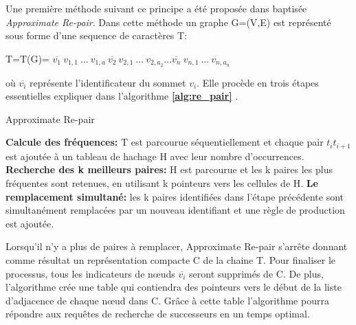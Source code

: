 		Une première méthode suivant ce principe a été proposée dans \citep{claude2010fast} baptisée \textit{Approximate Re-pair}. Dans cette méthode un graphe G=(V,E) est représenté sous forme d'une sequence de caractères T: \begin{center}
		T=T(G)= $\overline{v_{1}}\ v_{1,1}\ ...\ v_{1,a}\ \overline{v_{2}}\ v_{2,1}\ ...\ v_{2,a_{2}} ... \overline{v_{n}}\ v_{n,1}\ ...\ v_{n,a_{n}}\ $						
\end{center}	
où $\overline{v_{i}}$ représente l'identificateur du sommet $v_{i}$. Elle procède en trois étapes essentielles expliquer dans l'algorithme \textbf{\ref{alg:re_pair}} .
	\begin{algorithm}
		\caption{Approximate Re-pair}
		\label{alg:re_pair}
		\begin{algorithmic}[1]
			\STATE \textbf{Calcule des fréquences:} T est parcourue séquentiellement et chaque pair $t_{i}t_{i+1}$ est ajoutée à un tableau de hachage H avec leur nombre d'occurrences. 
			\STATE \textbf{Recherche des k meilleurs paires:}  H est parcourue et les k paires les plus fréquentes sont retenues, en utilisant k pointeurs vers les cellules de H.
			\STATE \textbf{Le remplacement simultané:} les k paires identifiées dans l'étape précédente sont simultanément remplacées par un nouveau identifiant et une règle de production est ajoutée.
		\end{algorithmic}
	\end{algorithm}
	Lorsqu'il n'y a plus de paires à remplacer, Approximate Re-pair s'arrête donnant comme résultat un représentation compacte C de la chaine T. Pour finaliser le processus, tous les indicateurs de nœuds $\overline{v_{i}}$ seront supprimés de C. De plus, l'algorithme crée une table qui contiendra des pointeurs vers le début de la liste d'adjacence de chaque nœud dans C. Grâce à cette table l'algorithme pourra répondre aux requêtes de recherche de successeurs en un temps optimal.